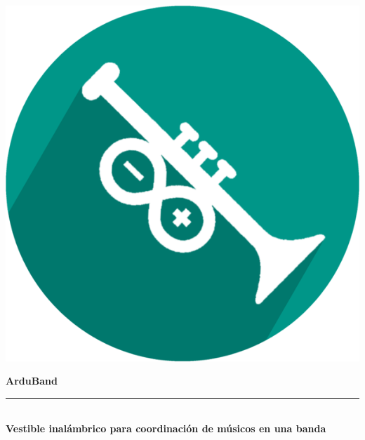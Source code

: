 \begin{titlepage}


\setlength{\centeroffset}{-0.5\oddsidemargin}
\addtolength{\centeroffset}{0.5\evensidemargin}
\thispagestyle{empty}

\noindent\hspace*{\centeroffset}\begin{minipage}{\textwidth}

\centering

\includegraphics{imagenes/logo.png}
 \vspace{0.5cm}


{\Huge\bfseries ArduBand\\
}
\noindent\rule[-1ex]{\textwidth}{3pt}\\[3.5ex]
{\large\bfseries Vestible inalámbrico para coordinación de músicos en una banda\\[4cm]}
\end{minipage}

\vspace{3cm}
\noindent\hspace*{\centeroffset}\begin{minipage}{\textwidth}
\centering


\end{minipage}
\end{titlepage}
